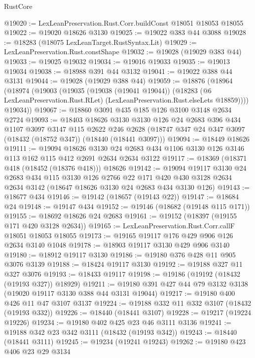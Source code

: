 \begin{lexlean}{RustCore}
\begin{coremodule}
@19020 := LexLeanPreservation.Rust.Corr.buildConst @18051 @18053 @18055
@19022 := @19020 @18626 @3130
@19025 := @19022 @383 @44 @3088
@19028 := @18283 (@18075 LexLeanTarget.RustSyntax.Lit)
@19029 := LexLeanPreservation.Rust.constShape
@19032 := @19028 (@19029 @383 @44)
@19033 := @19025 @19032
@19034 := @19016 @19033
@19035 := @19013 @19034
@19038 := @18988 @391 @44 @3132
@19041 := @19022 @388 @44 @3131
@19044 := @19028 (@19029 @388 @44)
@19059 := @18876
    (@18964
      (@18974
        (@19003
          (@19035
            (@19038 (@19041 @19044))
            (@18283 (@6 LexLeanPreservation.Rust.RLet) (LexLeanPreservation.Rust.elseLets @18859))))
        @19034))
@19067 := @18860 @3091 @435 @185 @126 @3100 @3148 @2634 @2724
@19093 := @18403
    @18626
    @3130
    @3130
    @126
    @24
    @2683
    @396
    @434
    @1107
    @3097
    @3147
    @115
    @2622
    @246
    @2628
    (@18747 @347 @24 @347 @3097 (@18432 (@18752 @347)) (@18440 (@18441 @3097)))
@19094 := @18449 @18626
@19111 := @19094
    @18626
    @3130
    @24
    @2683
    @434
    @1106
    @3130
    @126
    @3146
    @113
    @162
    @115
    @412
    @2691
    @2634
    @2634
    @3122
@19117 := @18369 (@18371 @418 (@18452 (@18376 @418))) @18626
@19142 := @19094
    @19117
    @3130
    @24
    @2683
    @434
    @115
    @3130
    @126
    @2766
    @22
    @171
    @420
    @430
    @3128
    @2634
    @2634
    @3142
    (@18647 @18626 @3130 @24 @2683 @434 @3130 @126)
@19143 := @18677 @434
@19146 := @19142 (@18657 (@19143 @22))
@19147 := @18684 @24
@19148 := @19147 @434
@19152 := @19146 (@18682 (@19148 @115 @171))
@19155 := @18692 @18626 @24 @2683
@19161 := @19152 (@18397 (@19155 @171 @420 @3128 @2634))
@19165 := LexLeanPreservation.Rust.Corr.callF @18051 @18053 @18055
@19173 := @19165 @19117 @176 @429 @906 @126 @2634 @3140 @1048
@19178 := @18903 @19117 @3130 @429 @906 @3140
@19180 := @18912 @19117 @3130
@19186 := @19180 @376 @428 @11 @905 @3076 @3139
@19188 := @18424 @19117 @3130
@19192 := @19188 @327 @11 @327 @3076
@19193 := @18433 @19117
@19198 := @19186 (@19192 (@18432 (@19193 @327)) @18929)
@19211 := @19180 @391 @427 @44 @79 @3132 @3138 (@19020 @19117 @3130 @388 @44 @3131 @19044)
@19217 := @19180 @400 @426 @11 @47 @3107 @3137
@19224 := @19188 @332 @11 @332 @3107 (@18432 (@19193 @332))
@19226 := @18440 (@18441 @3107)
@19228 := @19217 (@19224 @19226)
@19234 := @19180 @402 @425 @23 @46 @3111 @3136
@19241 := @19188 @342 @23 @342 @3111 (@18432 (@19193 @342))
@19243 := @18440 (@18441 @3111)
@19245 := @19234 (@19241 @19243)
@19262 := @19180
    @423
    @406
    @23
    @29
    @3134

\end{coremodule}
\end{lexlean}
